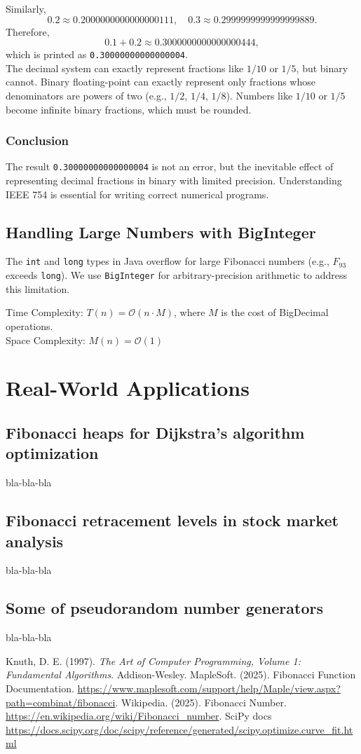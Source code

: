 \documentclass{article}
\begin{document}
Similarly,
\[
0.2 \approx 0.2000000000000000111, \quad
0.3 \approx 0.2999999999999999889.
\]
Therefore,
\[
0.1 + 0.2 \approx 0.3000000000000000444,
\]
which is printed as \texttt{0.30000000000000004}.
\\
The decimal system can exactly represent fractions like $1/10$ or $1/5$,
but binary cannot. Binary floating-point can exactly represent only fractions
whose denominators are powers of two (e.g., $1/2$, $1/4$, $1/8$). Numbers like
$1/10$ or $1/5$ become infinite binary fractions, which must be rounded.

\subsubsection{Conclusion}
The result \texttt{0.30000000000000004} is not an error, but the inevitable
effect of representing decimal fractions in binary with limited precision.
Understanding IEEE 754 is essential for writing correct numerical programs.

\subsection{Handling Large Numbers with BigInteger}
The \texttt{int} and \texttt{long} types in Java overflow for large Fibonacci numbers (e.g., $F_{93}$ exceeds \texttt{long}). We use \texttt{BigInteger} for arbitrary-precision arithmetic to address this limitation.

Time Complexity: $T(n) = \mathcal{O}(n \cdot M)$, where $M$ is the cost of BigDecimal operations. \\
Space Complexity: $M(n) = \mathcal{O}(1)$

\section{Real-World Applications}
\subsection{Fibonacci heaps for Dijkstra's algorithm optimization}
bla-bla-bla
\subsection{Fibonacci retracement levels in stock market analysis}
bla-bla-bla
\subsection{Some of pseudorandom number generators}
bla-bla-bla


\begin{thebibliography}{9}
Knuth, D. E. (1997). \textit{The Art of Computer Programming, Volume 1: Fundamental Algorithms}. Addison-Wesley.
MapleSoft. (2025). Fibonacci Function Documentation. \url{https://www.maplesoft.com/support/help/Maple/view.aspx?path=combinat/fibonacci}.
Wikipedia. (2025). Fibonacci Number. \url{https://en.wikipedia.org/wiki/Fibonacci_number}.
SciPy docs \url{https://docs.scipy.org/doc/scipy/reference/generated/scipy.optimize.curve_fit.html}
\end{thebibliography}
\end{document}
